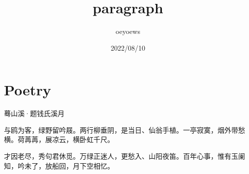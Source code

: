 \documentclass{ctexart}
\title{paragraph}
\author{oeyoews}
\date{2022/08/10}
\begin{document}
\maketitle

\section{Poetry}%
\label{sec:Paragraph}


\centerline{ 蓦山溪·题钱氏溪月 }

与鸥为客，绿野留吟屐。两行柳垂阴，是当日、仙翁手植。一亭寂寞，烟外带愁横。荷苒苒，展凉云，横卧虹千尺。

才因老尽，秀句君休觅。万绿正迷人，更愁入、山阳夜笛。百年心事，惟有玉阑知，吟未了，放船回，月下空相忆。
\end{document}
